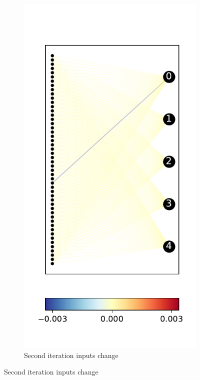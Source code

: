 \documentclass{easychair}
\begin{document}
\begin{figure}
\begin{subfigure}{0.2\linewidth}
\end{subfigure}
\begin{subfigure}{0.2\linewidth}
  \includegraphics[width=\linewidth]{./images/ACASXU_2_9_3_vals.pdf}
  \caption{Second iteration inputs change}
\end{subfigure}

\end{figure}
\end{document}
